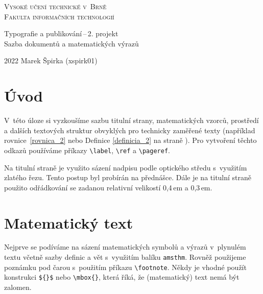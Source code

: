 \documentclass[a4paper, twocolumn, 11pt]{article}
\begin{document}
    \begin{titlepage}
    	\begin{center}
    		\Huge{\textsc{Vysoké učení technické v~Brně}}\\
    	    \huge{\textsc{Fakulta informačních technologií}}
    	    
    		\LARGE
    		Typografie a publikování\,–\,2. projekt\\
    		Sazba dokumentů a matematických výrazů
    		
    	\end{center}
    	\Large 2022 \hfill Marek Špirka (xspirk01)
\end{titlepage}

\section*{Úvod}
    V~této úloze si vyzkoušíme sazbu titulní strany, matematických vzorců, prostředí a dalších textových struktur obvyklých pro technicky zaměřené texty (například rovnice~\eqref{rovnica_2} nebo Definice \ref{definicia_2} na straně \pageref{definicia_1}). Pro vytvoření těchto odkazů používáme příkazy \verb|\label|, \verb|\ref| a \verb|\pageref|.
    
    Na titulní straně je využito sázení nadpisu podle optického středu s~využitím zlatého řezu. Tento postup byl probírán na přednášce. Dále je na titulní straně použito odřádkování se zadanou relativní velikostí 0,4\,em a 0,3\,em.
    
    
\section{Matematický text}
    Nejprve se podíváme na sázení matematických symbolů \linebreak a výrazů v~plynulém textu včetně sazby definic a vět s~využitím balíku \verb|amsthm|. Rovněž použijeme poznámku pod čarou s~použitím příkazu \verb|\footnote|. Někdy je vhodné použít konstrukci \verb|${}$| nebo \verb|\mbox{}|, která říká, že (matematický) text nemá být zalomen. 
\end{document}
